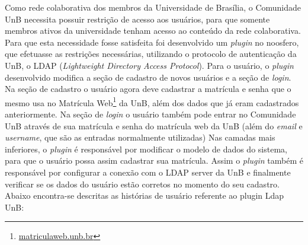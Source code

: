 Como rede colaborativa dos membros da Universidade de Brasília, o Comunidade UnB 
necessita possuir restrição de acesso aos usuários, para que somente membros ativos 
da universidade tenham acesso ao conteúdo da rede colaborativa. 
%
Para que esta necessidade fosse satisfeita foi desenvolvido um \textit{plugin} no noosfero, que efetuasse as restrições necessárias, utilizando o protocolo de autenticação da UnB, o LDAP (\textit{Lightweight Directory Access Protocol}).
%
Para o usuário, o \textit{plugin} desenvolvido modifica a seção de cadastro de novos usuários e a seção de \textit{login}. Na seção de cadastro o usuário agora deve cadastrar a matrícula e senha que o mesmo usa no Matrícula Web\footnote{\url{matriculaweb.unb.br}} da UnB, além dos dados que já eram cadastrados anteriormente. Na seção de \textit{login} o usuário também pode entrar no Comunidade UnB através de sua matrícula e senha do matrícula web da UnB (além do \textit{email} e \textit{username}, que são as entradas normalmente utilizadas)
%
Nas camadas mais inferiores, o \textit{plugin} é responsável por modificar o modelo de dados do sistema, para que o usuário possa assim cadastrar sua matrícula. Assim o \textit{plugin} também é responsável por configurar a conexão com o LDAP server da UnB e finalmente verificar se os dados do usuário estão corretos no momento do seu cadastro. Abaixo encontra-se descritas as histórias de usuário referente ao {plugin} Ldap UnB:
